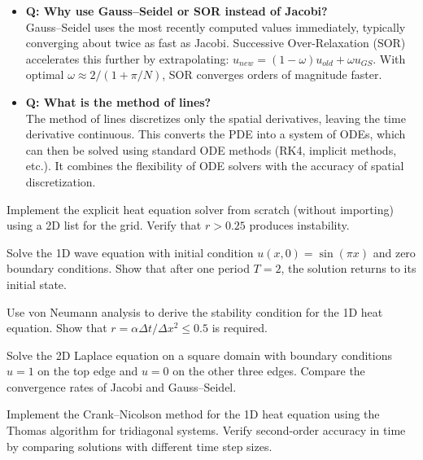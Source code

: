\begin{itemize}
\item \textbf{Q: Why use Gauss--Seidel or SOR instead of Jacobi?} \\
Gauss--Seidel uses the most recently computed values immediately, typically converging about
twice as fast as Jacobi. Successive Over-Relaxation (SOR) accelerates this further by extrapolating:
$u_{new} = (1-\omega)u_{old} + \omega u_{GS}$. With optimal $\omega \approx 2/(1+\pi/N)$, SOR
converges orders of magnitude faster.

\item \textbf{Q: What is the method of lines?} \\
The method of lines discretizes only the spatial derivatives, leaving the time derivative continuous.
This converts the PDE into a system of ODEs, which can then be solved using standard ODE methods
(RK4, implicit methods, etc.). It combines the flexibility of ODE solvers with the accuracy of
spatial discretization.
\end{itemize}

\begin{exercise}
Implement the explicit heat equation solver from scratch (without importing) using a 2D list for
the grid. Verify that $r > 0.25$ produces instability.
\end{exercise}

\begin{exercise}
Solve the 1D wave equation with initial condition $u(x,0) = \sin(\pi x)$ and zero boundary
conditions. Show that after one period $T = 2$, the solution returns to its initial state.
\end{exercise}

\begin{exercise}
Use von Neumann analysis to derive the stability condition for the 1D heat equation. Show that
$r = \alpha \Delta t / \Delta x^2 \leq 0.5$ is required.
\end{exercise}

\begin{exercise}
Solve the 2D Laplace equation on a square domain with boundary conditions $u=1$ on the top edge
and $u=0$ on the other three edges. Compare the convergence rates of Jacobi and Gauss--Seidel.
\end{exercise}

\begin{exercise}
Implement the Crank--Nicolson method for the 1D heat equation using the Thomas algorithm for
tridiagonal systems. Verify second-order accuracy in time by comparing solutions with different
time step sizes.
\end{exercise}

